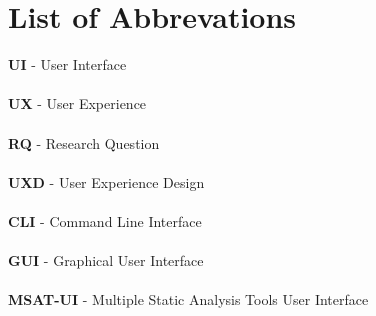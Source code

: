 \chapter{List of Abbrevations}

\textbf{UI} - User Interface \\ \\
\textbf{UX} - User Experience \\ \\
\textbf{RQ} - Research Question \\ \\
\textbf{UXD} - User Experience Design \\ \\
\textbf{CLI} - Command Line Interface \\ \\
\textbf{GUI} - Graphical User Interface \\ \\
\textbf{MSAT-UI} - Multiple Static Analysis Tools User Interface \\ \\